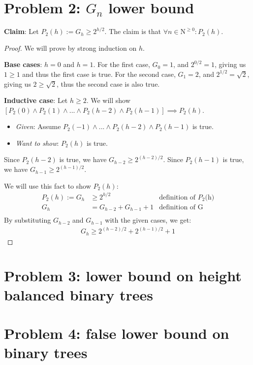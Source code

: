 \documentclass[titlepage]{article}
\begin{document}
\section{Problem 2: $G_n$ lower bound}

\textbf{Claim}: Let $P_2(h) := G_h \geq 2^{h/2}$.  The claim is that $\forall n \in \mathrm{N}^{\geq 0}: P_2(h)$.

\begin{proof}
We will prove by strong induction on $h$.

\textbf{Base cases}: $h=0$ and $h=1$.  For the first case, $G_{0} = 1$, and $2^{0/2} = 1$, giving us $1 \geq 1$ and thus the first case is true. For the second case, $G_1 = 2$, and $2^{1/2} = \sqrt{2}$, giving us $2 \geq \sqrt{2}$, thus the second case is also true. 


\textbf{Inductive case}: Let $h \geq 2$.  We will show $[P_2(0) \land P_2(1) \land ... \land P_2(h-2) \land P_2(h-1)] \implies P_2(h)$.
\begin{itemize}
\item \emph{Given}: Assume $P_2(-1) \land ... \land P_2(h-2) \land P_2(h-1)$ is true.
\item \emph{Want to show}: $P_2(h)$ is true.
\end{itemize}
Since $P_2(h-2)$ is true, we have
$G_{h-2} \geq 2^{(h-2)/2}$.
Since $P_2(h-1)$ is true, we have
$G_{h-1} \geq 2^{(h-1)/2}$.

We will use this fact to show $P_2(h)$:
\begin{align*}
P_2(h) := G_{h} &\geq 2^{h/2} & \text{definition of $P_2$(h)} \\
G_{h} &= G_{h-2} + G_{h-1} + 1 & \text{definition of G} \\
\end{align*}
By substituting $G_{h-2}$ and $G_{h-1}$ with the given cases, we get:\\
\begin{align*}
G_h \geq 2^{(h-2)/2} + 2^{(h-1)/2} + 1
\end{align*}
\end{proof}

\section{Problem 3: lower bound on height balanced binary trees}

\section{Problem 4: false lower bound on binary trees}
\end{document}
